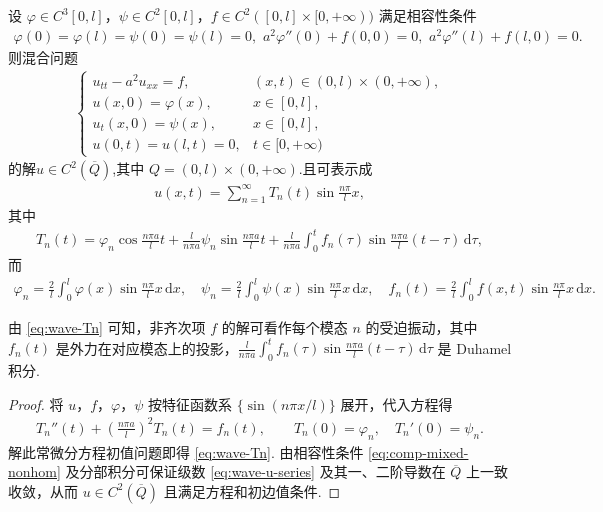 \documentclass[../../main.tex]{subfiles}%
\begin{document}
\begin{theorem}\label{theorem:一维波动方程的混合问题非齐次方程、齐次边值情形的解}
设 $\varphi\in C^3[0,l]$，$\psi\in C^2[0,l]$，$f\in C^2([0,l]\times[0,+\infty))$ 满足相容性条件
\begin{gather}
\varphi(0)=\varphi(l)=\psi(0)=\psi(l)=0, \,\,
a^2\varphi''(0)+f(0,0)=0,\,\,a^2\varphi''(l)+f(l,0)=0. \label{eq:comp-mixed-nonhom}
\end{gather}
则混合问题
\begin{align}
\begin{cases}
u_{tt}-a^2u_{xx}=f, & (x,t)\in(0,l)\times(0,+\infty), \\
u(x,0)=\varphi(x), & x\in[0,l], \\
u_t(x,0)=\psi(x), & x\in[0,l], \\
u(0,t)=u(l,t)=0, & t\in[0,+\infty)
\end{cases} \label{eq:wave-mixed-nonhom}
\end{align}
的解$u\in C^2(\overline{Q})$,其中 $Q=(0,l)\times(0,+\infty)$.且可表示成
\begin{align}
u(x,t)=\sum_{n=1}^{\infty}T_n(t)\sin\frac{n\pi}{l}x, \label{eq:wave-u-series}
\end{align}
其中
\begin{align}
T_n(t)=\varphi_n\cos\frac{n\pi a}{l}t+\frac{l}{n\pi a}\psi_n\sin\frac{n\pi a}{l}t 
+\frac{l}{n\pi a}\int_0^t f_n(\tau)\sin\frac{n\pi a}{l}(t-\tau)\,\mathrm{d}\tau, \label{eq:wave-Tn}
\end{align}
而
\begin{align*}
\varphi_n=\frac{2}{l}\int_0^l\varphi(x)\sin\frac{n\pi}{l}x\,\mathrm{d}x,\quad
\psi_n=\frac{2}{l}\int_0^l\psi(x)\sin\frac{n\pi}{l}x\,\mathrm{d}x, \quad
f_n(t)=\frac{2}{l}\int_0^l f(x,t)\sin\frac{n\pi}{l}x\,\mathrm{d}x. 
\end{align*}
\end{theorem}
\begin{remark}
由 \eqref{eq:wave-Tn} 可知，非齐次项 $f$ 的解可看作每个模态 $n$ 的受迫振动，其中 $f_n(t)$ 是外力在对应模态上的投影，$\frac{l}{n\pi a}\int_0^t f_n(\tau)\sin\frac{n\pi a}{l}(t-\tau)\,\mathrm{d}\tau$ 是 Duhamel 积分.
\end{remark}
\begin{proof}
将 $u$，$f$，$\varphi$，$\psi$ 按特征函数系 $\{\sin(n\pi x/l)\}$ 展开，代入方程得
\begin{align*}
T_n''(t)+\left(\frac{n\pi a}{l}\right)^2T_n(t)=f_n(t),\qquad T_n(0)=\varphi_n,\quad T_n'(0)=\psi_n.
\end{align*}
解此常微分方程初值问题即得 \eqref{eq:wave-Tn}. 由相容性条件 \eqref{eq:comp-mixed-nonhom} 及分部积分可保证级数 \eqref{eq:wave-u-series} 及其一、二阶导数在 $\overline{Q}$ 上一致收敛，从而 $u\in C^2(\overline{Q})$ 且满足方程和初边值条件.
\end{proof}
\end{document}
